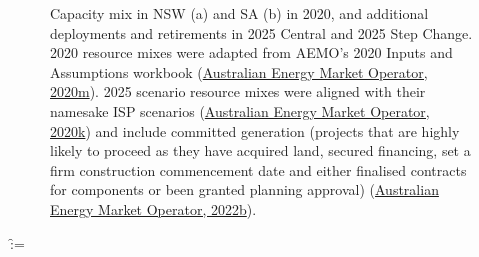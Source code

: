 \documentclass[12pt,a4paper,]{report}
\makeatletter
\newcounter{pandoccrossref@subfigures@footnote@counter}
\newenvironment{pandoccrossrefsubfigures}{%
\setcounter{pandoccrossref@subfigures@footnote@counter}{0}
\begin{figure}\centering%
\gdef\global@pandoccrossref@subfigures@footnotes{}%
\DeclareRobustCommand{\footnote}[1]{\footnotemark%
\stepcounter{pandoccrossref@subfigures@footnote@counter}%
\ifx\global@pandoccrossref@subfigures@footnotes\empty%
\gdef\global@pandoccrossref@subfigures@footnotes{{##1}}%
\else%
\g@addto@macro\global@pandoccrossref@subfigures@footnotes{, {##1}}%
\fi}}%
{\end{figure}%
\addtocounter{footnote}{-\value{pandoccrossref@subfigures@footnote@counter}}
\@for\f:=\global@pandoccrossref@subfigures@footnotes\do{\stepcounter{footnote}\footnotetext{\f}}%
\gdef\global@pandoccrossref@subfigures@footnotes{}}
\makeatother
\begin{document}
\begin{pandoccrossrefsubfigures}



\caption[Capacity mix in NSW and SA in 2020 and the two 2025 scenarios]{Capacity mix in NSW (a) and SA (b) in
2020, and additional deployments and retirements in 2025 Central and
2025 Step Change. 2020 resource mixes were adapted from AEMO's 2020
Inputs and Assumptions workbook
(\protect\hyperlink{ref-australianenergymarketoperator2020InputsAssumptions2020}{Australian
Energy Market Operator, 2020m}). 2025 scenario resource mixes were
aligned with their namesake ISP scenarios
(\protect\hyperlink{ref-australianenergymarketoperator2020ISPGeneration2020}{Australian
Energy Market Operator, 2020k}) and include committed generation
(projects that are highly likely to proceed as they have acquired land,
secured financing, set a firm construction commencement date and either
finalised contracts for components or been granted planning approval)
(\protect\hyperlink{ref-australianenergymarketoperatorGenerationInformation2022}{Australian
Energy Market Operator, 2022b}).}

\label{fig:capacities}

\end{pandoccrossrefsubfigures}
\end{document}
